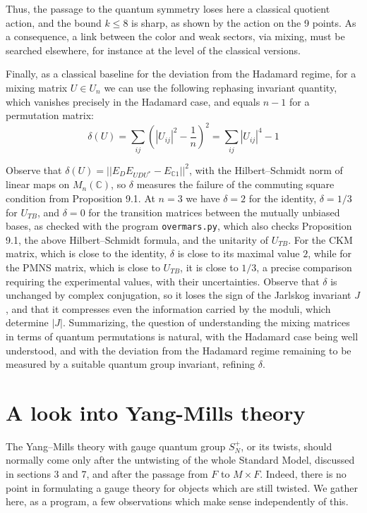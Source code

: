\documentclass[11pt]{amsart}
\theoremstyle{definition}
\begin{document}
Thus, the passage to the quantum symmetry loses here a classical quotient action, and the bound $k\leq8$ is sharp, as shown by the action on the 9 points. As a consequence, a link between the color and weak sectors, via mixing, must be searched elsewhere, for instance at the level of the classical versions.

Finally, as a classical baseline for the deviation from the Hadamard regime, for a mixing matrix $U\in U_n$ we can use the following rephasing invariant quantity, which vanishes precisely in the Hadamard case, and equals $n-1$ for a permutation matrix:
$$\delta(U)=\sum_{ij}\left(|U_{ij}|^2-\frac{1}{n}\right)^2=\sum_{ij}|U_{ij}|^4-1$$

Observe that $\delta(U)=||E_DE_{UDU^*}-E_{\mathbb C1}||^2$, with the Hilbert--Schmidt norm of linear maps on $M_n(\mathbb C)$, so $\delta$ measures the failure of the commuting square condition from Proposition 9.1. At $n=3$ we have $\delta=2$ for the identity, $\delta=1/3$ for $U_{TB}$, and $\delta=0$ for the transition matrices between the mutually unbiased bases, as checked with the program {\tt overmars.py}, which also checks Proposition 9.1, the above Hilbert--Schmidt formula, and the unitarity of $U_{TB}$. For the CKM matrix, which is close to the identity, $\delta$ is close to its maximal value $2$, while for the PMNS matrix, which is close to $U_{TB}$, it is close to $1/3$, a precise comparison requiring the experimental values, with their uncertainties. Observe that $\delta$ is unchanged by complex conjugation, so it loses the sign of the Jarlskog invariant $J$, and that it compresses even the information carried by the moduli, which determine $|J|$. Summarizing, the question of understanding the mixing matrices in terms of quantum permutations is natural, with the Hadamard case being well understood, and with the deviation from the Hadamard regime remaining to be measured by a suitable quantum group invariant, refining $\delta$.

\section{A look into Yang-Mills theory}

The Yang--Mills theory with gauge quantum group $S_N^+$, or its twists, should normally come only after the untwisting of the whole Standard Model, discussed in sections 3 and 7, and after the passage from $F$ to $M\times F$. Indeed, there is no point in formulating a gauge theory for objects which are still twisted. We gather here, as a program, a few observations which make sense independently of this.
\end{document}
